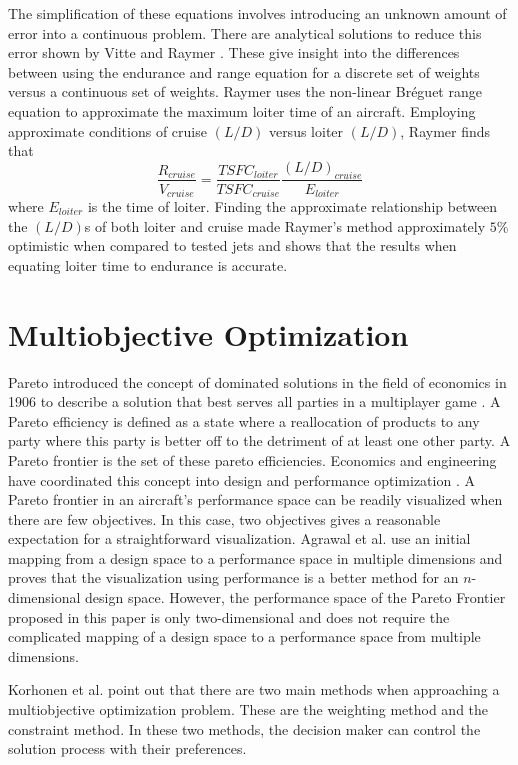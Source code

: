 \par 
The simplification of these equations involves introducing an unknown amount of error into a continuous problem. There are analytical solutions to reduce this error shown by Vitte \cite{OptimizeBreguet} and Raymer \cite{LoiterTimeFromRange}. These give insight into the differences between using the endurance and range equation for a discrete set of weights versus a continuous set of weights. Raymer \cite{LoiterTimeFromRange} uses the non-linear Br\'eguet range equation to approximate the maximum loiter time of an aircraft. Employing approximate conditions of cruise $(L/D)$ versus loiter $(L/D)$, Raymer \cite{LoiterTimeFromRange} finds that 
\begin{equation}
    \dfrac{R_{cruise}}{V_{cruise}} = \dfrac{TSFC_{loiter}}{TSFC_{cruise}}\dfrac{(L/D)_{cruise}}{E_{loiter}}
\end{equation}
where $E_{loiter}$ is the time of loiter. Finding the approximate relationship between the $(L/D)$s of both loiter and cruise made Raymer's method approximately $5\%$ optimistic when compared to tested jets and shows that the results when equating loiter time to endurance is accurate.
\section{Multiobjective Optimization}
Pareto introduced the concept of dominated solutions in the field of economics in 1906 to describe a solution that best serves all parties in a multiplayer game \cite{paretomanual}. A Pareto efficiency is defined as a state where a reallocation of products to any party where this party is better off to the detriment of at least one other party. A Pareto frontier is the set of these pareto efficiencies. Economics and engineering have coordinated this concept into design and performance optimization \cite{surveyMarler}. A Pareto frontier in an aircraft's performance space can be readily visualized when there are few objectives. In this case, two objectives gives a reasonable expectation for a straightforward visualization. Agrawal et al. \cite{MultiobjectiveVisualization} use an initial mapping from a design space to a performance space in multiple dimensions and proves that the visualization using performance is a better method for an $n$-dimensional design space. However, the performance space of the Pareto Frontier proposed in this paper is only two-dimensional and does not require the complicated mapping of a design space to a performance space from multiple dimensions. 
\par
Korhonen et al. \cite{MultOptCS} point out that there are two main methods when approaching a multiobjective optimization problem. These are the weighting method and the constraint method. In these two methods, the decision maker can control the solution process with their preferences.\par
